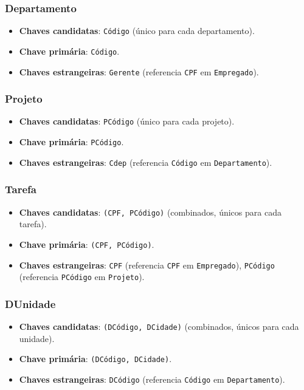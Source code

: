 \documentclass[a4paper,12pt]{article}
\begin{document}
\subsubsection*{Departamento}
\begin{itemize}
    \item \textbf{Chaves candidatas}: \texttt{Código} (único para cada departamento).
    \item \textbf{Chave primária}: \texttt{Código}.
    \item \textbf{Chaves estrangeiras}: \texttt{Gerente} (referencia \texttt{CPF} em \texttt{Empregado}).
\end{itemize}

\subsubsection*{Projeto}
\begin{itemize}
    \item \textbf{Chaves candidatas}: \texttt{PCódigo} (único para cada projeto).
    \item \textbf{Chave primária}: \texttt{PCódigo}.
    \item \textbf{Chaves estrangeiras}: \texttt{Cdep} (referencia \texttt{Código} em \texttt{Departamento}).
\end{itemize}

\subsubsection*{Tarefa}
\begin{itemize}
    \item \textbf{Chaves candidatas}: \texttt{(CPF, PCódigo)} (combinados, únicos para cada tarefa).
    \item \textbf{Chave primária}: \texttt{(CPF, PCódigo)}.
    \item \textbf{Chaves estrangeiras}: \texttt{CPF} (referencia \texttt{CPF} em \texttt{Empregado}), \texttt{PCódigo} (referencia \texttt{PCódigo} em \texttt{Projeto}).
\end{itemize}

\subsubsection*{DUnidade}
\begin{itemize}
    \item \textbf{Chaves candidatas}: \texttt{(DCódigo, DCidade)} (combinados, únicos para cada unidade).
    \item \textbf{Chave primária}: \texttt{(DCódigo, DCidade)}.
    \item \textbf{Chaves estrangeiras}: \texttt{DCódigo} (referencia \texttt{Código} em \texttt{Departamento}).
\end{itemize}
\end{document}
